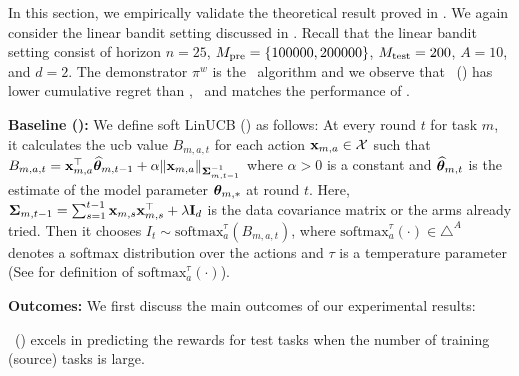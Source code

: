 In this section, we empirically validate the theoretical result proved in . We again consider the linear bandit setting discussed in . Recall that the linear bandit setting consist of horizon $n=25$, $M_{\text{pre}} = \{100000, 200000\}$, $M_{\text{test}} = 200$, $A=10$, and $d=2$. 
%
%
The demonstrator $\pi^w$ is the \ts\ algorithm and we observe that \pred\ (\gt) has lower cumulative regret than \dptg, \ad\ and matches the performance of \linucb. 

\textbf{Baseline (\linucbt):} We define soft LinUCB (\linucbt) as follows: At every round $t$ for task $m$, it calculates the ucb value $B_{m,a,t}$ for each action $\mathbf{x}_{m,a} \in \mathcal{X}$ such that $B_{m,a,t} = \mathbf{x}_{m,a}^\top \widehat{\boldsymbol{\theta}}_{m,t-1} + \alpha\|\mathbf{x}_{m,a}\|_{\mathbf{\Sigma}_{m,t-1}^{-1}}$ where $\alpha > 0$ is a constant and $\widehat{\boldsymbol{\theta}}_{m,t}$ is the estimate of the model parameter $\boldsymbol{\theta}_{m, *}$ at round $t$. 
%
Here, $\mathbf{\Sigma}_{m,t-1} = \sum_{s=1}^{t-1}\mathbf{x}_{m,s}\mathbf{x}_{m,s}^\top +\lambda\mathbf{I}_d$ is the data covariance matrix or the arms already tried.
%
Then it chooses $I_t \sim \mathrm{softmax}_a^\tau(B_{m,a,t})$, where $\mathrm{softmax}_a^\tau(\cdot)\in\triangle^A$ denotes a softmax distribution over the actions and $\tau$ is a temperature parameter (See  for definition of $\mathrm{softmax}_a^\tau(\cdot)$).

\textbf{Outcomes:} We first discuss the main outcomes of our experimental results:

\begin{tcolorbox}
\customfinding \pred\ (\gt) excels in predicting the rewards for test tasks when the number of training (source) tasks is large. 
\end{tcolorbox}





